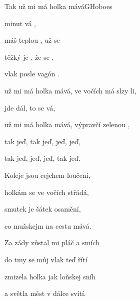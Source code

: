 \setcounter{page}{84}
\begin{song}{Tak už mi má holka mává}{G}{Hoboes}

\begin{SBVerse}

  minut vá ,

máš teplou , už se 

těžký je , že se  ,

vlak posle vagón .

\end{SBVerse}

\begin{SBChorus}

 už mi má holka mává, ve vočích má slzy li,

 jde dál, to se vá,  

 už mi má holka mává, výpravčí zelenou ,

tak  jeď, tak jeď, jeď, jeď,

tak jeď, jeď, jeď, tak jeď.

\end{SBChorus}

\begin{SBVerse}

Koleje jsou cejchem loučení,

holkám se ve vočích střádá,

smutek je šátek osamění,

co mužskejm na cestu mává.

\end{SBVerse}

\begin{SBChorus}

\end{SBChorus}

\begin{SBVerse}

Za zády zůstal mi pláč a smích

do tmy se můj vlak teď řítí

zmizela holka jak loňskej sníh

a světla měst v dálce svítí.

\end{SBVerse}

\begin{SBChorus}

\end{SBChorus}

\end{song}

\clearpage
